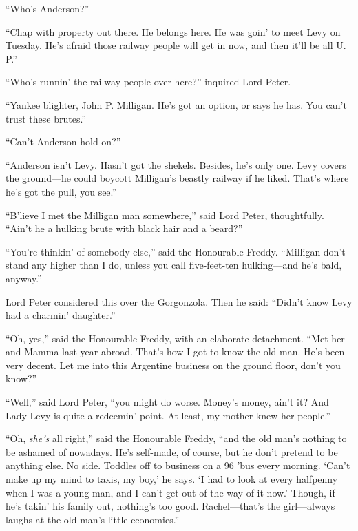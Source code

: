\enquote{Who’s Anderson?}

\enquote{Chap with property out there. He belongs here. He was goin’ to meet Levy on Tuesday. He’s afraid those railway people will get in now, and then it’ll be all U. P.}

\enquote{Who’s runnin’ the railway people over here?} inquired Lord Peter.

\enquote{Yankee blighter, John P. Milligan. He’s got an option, or says he has. You can’t trust these brutes.}

\enquote{Can’t Anderson hold on?}

\enquote{Anderson isn’t Levy. Hasn’t got the shekels. Besides, he’s only one. Levy covers the ground\allowbreak---\allowbreak he could boycott Milligan’s beastly railway if he liked. That’s where he’s got the pull, you see.}

\enquote{B’lieve I met the Milligan man somewhere,} said Lord Peter, thoughtfully. \enquote{Ain’t he a hulking brute with black hair and a beard?}

\enquote{You’re thinkin’ of somebody else,} said the Honourable Freddy. \enquote{Milligan don’t stand any higher than I do, unless you call five-feet-ten hulking\allowbreak---\allowbreak and he’s bald, anyway.}

Lord Peter considered this over the Gorgonzola. Then he said: \enquote{Didn’t know Levy had a charmin’ daughter.}

\enquote{Oh, yes,} said the Honourable Freddy, with an elaborate detachment. \enquote{Met her and Mamma last year abroad. That’s how I got to know the old man. He’s been very decent. Let me into this Argentine business on the ground floor, don’t you know?}

\enquote{Well,} said Lord Peter, \enquote{you might do worse. Money’s money, ain’t it? And Lady Levy is quite a redeemin’ point. At least, my mother knew her people.}

\enquote{Oh, \textit{she’s} all right,} said the Honourable Freddy, \enquote{and the old man’s nothing to be ashamed of nowadays. He’s self-made, of course, but he don’t pretend to be anything else. No side. Toddles off to business on a 96 ’bus every morning. \enquote{Can’t make up my mind to taxis, my boy,} he says. \enquote{I had to look at every halfpenny when I was a young man, and I can’t get out of the way of it now.} Though, if he’s takin’ his family out, nothing’s too good. Rachel\allowbreak---\allowbreak that’s the girl\allowbreak---\allowbreak always laughs at the old man’s little economies.}

